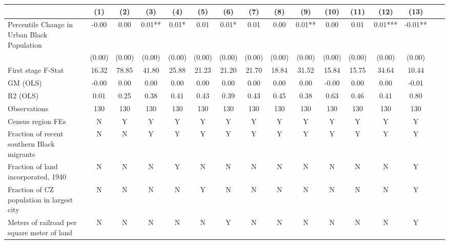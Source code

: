  \begin{tabular}{l*{15}{c}} \toprule
                    &\multicolumn{1}{c}{(1)}   &\multicolumn{1}{c}{(2)}   &\multicolumn{1}{c}{(3)}   &\multicolumn{1}{c}{(4)}   &\multicolumn{1}{c}{(5)}   &\multicolumn{1}{c}{(6)}   &\multicolumn{1}{c}{(7)}   &\multicolumn{1}{c}{(8)}   &\multicolumn{1}{c}{(9)}   &\multicolumn{1}{c}{(10)}   &\multicolumn{1}{c}{(11)}   &\multicolumn{1}{c}{(12)}   &\multicolumn{1}{c}{(13)}   \\
\midrule
Percentile Change in Urban Black Population& -0.00   &  0.00   &  0.01** &  0.01*  &  0.01   &  0.01*  &  0.01   &  0.00   &  0.01** &  0.00   &  0.01   &  0.01***& -0.01** \\
                    &(0.00)   &(0.00)   &(0.00)   &(0.00)   &(0.00)   &(0.00)   &(0.00)   &(0.00)   &(0.00)   &(0.00)   &(0.00)   &(0.00)   &(0.00)   \\
\midrule
First stage F-Stat  & 16.32   & 78.85   & 41.80   & 25.88   & 21.23   & 21.20   & 21.70   & 18.84   & 31.52   & 15.84   & 15.75   & 34.64   & 10.44   \\
GM (OLS)            & -0.00   &  0.00   &  0.00   &  0.00   &  0.00   &  0.00   &  0.00   &  0.00   &  0.00   & -0.00   &  0.00   &  0.00   & -0.01   \\
R2 (OLS)            &  0.01   &  0.25   &  0.38   &  0.41   &  0.43   &  0.39   &  0.43   &  0.45   &  0.38   &  0.63   &  0.46   &  0.41   &  0.80   \\
Observations        &   130   &   130   &   130   &   130   &   130   &   130   &   130   &   130   &   130   &   130   &   130   &   130   &   130   \\
Census region FEs   &     N   &     Y   &     Y   &     Y   &     Y   &     Y   &     Y   &     Y   &     Y   &     Y   &     Y   &     Y   &     Y   \\
Fraction of recent southern Black migrants&     N   &     N   &     Y   &     Y   &     Y   &     Y   &     Y   &     Y   &     Y   &     Y   &     Y   &     Y   &     Y   \\
Fraction of land incorporated, 1940&     N   &     N   &     N   &     Y   &     N   &     N   &     N   &     N   &     N   &     N   &     N   &     N   &     Y   \\
Fraction of CZ population in largest city&     N   &     N   &     N   &     N   &     Y   &     N   &     N   &     N   &     N   &     N   &     N   &     N   &     Y   \\
Meters of railroad per square meter of land&     N   &     N   &     N   &     N   &     N   &     Y   &     N   &     N   &     N   &     N   &     N   &     N   &     Y   \\

\end{tabular}
